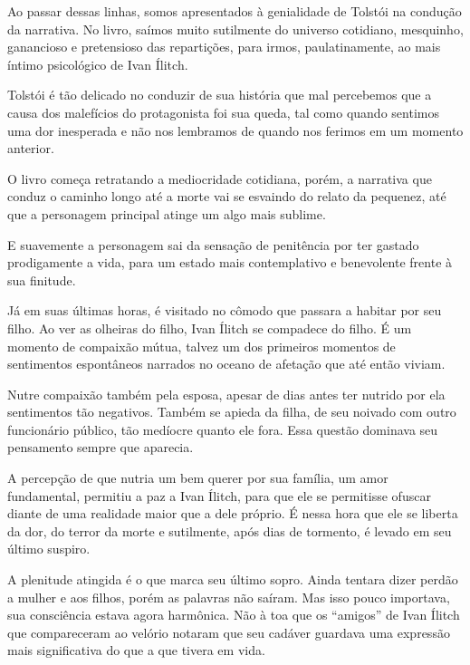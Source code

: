 \documentclass[12pt]{extarticle}
\begin{document}
Ao passar dessas linhas, somos apresentados à genialidade 
de Tolstói na condução da narrativa. No livro, saímos muito
sutilmente do universo cotidiano, mesquinho, ganancioso e pretensioso
das repartições, para irmos, paulatinamente, ao
mais íntimo psicológico de Ivan Ílitch.

Tolstói é tão delicado no conduzir de sua história que mal percebemos
que a causa dos malefícios do protagonista foi sua queda, tal como
quando sentimos uma dor inesperada e não nos lembramos de quando nos
ferimos em um momento anterior.

O livro começa retratando a mediocridade cotidiana, porém, a narrativa
que conduz o caminho longo até a morte vai se esvaindo do relato da
pequenez, até que a personagem principal atinge um algo mais sublime.

E suavemente a personagem sai da sensação de penitência por ter
gastado prodigamente a vida, para um estado mais contemplativo e
benevolente frente à sua finitude.

Já em suas últimas horas, é visitado no cômodo que passara a habitar por
seu filho. Ao ver as olheiras do filho, Ivan Ílitch se compadece do
filho. É um momento de compaixão mútua, talvez um dos primeiros momentos
de sentimentos espontâneos narrados no oceano de afetação que até então
viviam.

Nutre compaixão também pela esposa, apesar de dias antes ter nutrido por
ela sentimentos tão negativos. Também se apieda da filha, de 
seu noivado com outro funcionário público,
tão medíocre quanto ele fora. Essa questão 
dominava seu pensamento sempre que aparecia.

A percepção de que nutria um bem
querer por sua família, um amor fundamental, permitiu a
paz a Ivan Ílitch, para que ele se permitisse ofuscar diante de uma
realidade maior que a dele próprio. É nessa hora que ele se liberta da dor,
do terror da morte e sutilmente, após dias de tormento, é levado em
seu último suspiro.

A plenitude atingida é o que marca seu último sopro. Ainda tentara dizer
perdão a mulher e aos filhos, porém as palavras não saíram. Mas isso
pouco importava, sua consciência estava agora harmônica.
Não à toa que os ``amigos'' de Ivan Ílitch que compareceram ao velório
notaram que seu cadáver guardava uma expressão mais significativa do que
a que tivera em vida.


\end{document}
